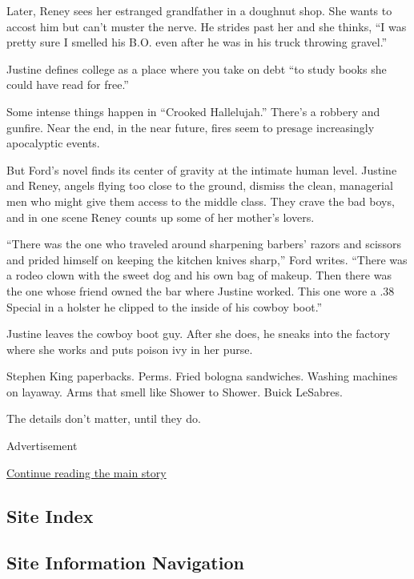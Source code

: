 Later, Reney sees her estranged grandfather in a doughnut shop. She
wants to accost him but can't muster the nerve. He strides past her and
she thinks, ``I was pretty sure I smelled his B.O. even after he was in
his truck throwing gravel.''

Justine defines college as a place where you take on debt ``to study
books she could have read for free.''

Some intense things happen in ``Crooked Hallelujah.'' There's a robbery
and gunfire. Near the end, in the near future, fires seem to presage
increasingly apocalyptic events.

But Ford's novel finds its center of gravity at the intimate human
level. Justine and Reney, angels flying too close to the ground, dismiss
the clean, managerial men who might give them access to the middle
class. They crave the bad boys, and in one scene Reney counts up some of
her mother's lovers.

``There was the one who traveled around sharpening barbers' razors and
scissors and prided himself on keeping the kitchen knives sharp,'' Ford
writes. ``There was a rodeo clown with the sweet dog and his own bag of
makeup. Then there was the one whose friend owned the bar where Justine
worked. This one wore a .38 Special in a holster he clipped to the
inside of his cowboy boot.''

Justine leaves the cowboy boot guy. After she does, he sneaks into the
factory where she works and puts poison ivy in her purse.

Stephen King paperbacks. Perms. Fried bologna sandwiches. Washing
machines on layaway. Arms that smell like Shower to Shower. Buick
LeSabres.

The details don't matter, until they do.

Advertisement

\protect\hyperlink{after-bottom}{Continue reading the main story}

\hypertarget{site-index}{%
\subsection{Site Index}\label{site-index}}

\hypertarget{site-information-navigation}{%
\subsection{Site Information
Navigation}\label{site-information-navigation}}

